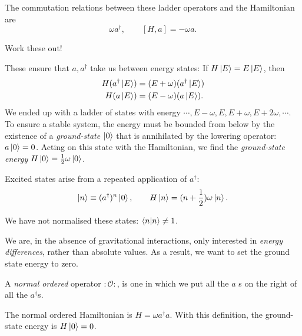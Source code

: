 The commutation relations between these ladder operators and the Hamiltonian are
\begin{equation}
  [H, a^\dagger] \omega a^\dagger, \qquad [H, a] = -\omega a.
\end{equation} 
\begin{exercise}
Work these out!
\end{exercise}
These ensure that $a, a^\dagger$ take us between energy states:
If $H \ket{E} = E \ket{E}$, then
\begin{align}
  H(a^\dagger \ket{E}) &= (E + \omega) (a^\dagger \ket{E}) \\
  H(a \ket{ E}) &=(E - \omega) (a \ket{E}).
\end{align}
We ended up with a ladder of states with energy $\cdots, E-\omega, E, E + \omega, E + 2 \omega, \cdots$.
To ensure a stable system, the energy must be bounded from below by the existence of a \emph{ground-state} $\ket{0}$ that is annihilated by the lowering operator: $a \ket{0} = 0$.
Acting on this state with the Hamiltonian, we find the \emph{ground-state energy} $H \ket{0} = \frac{1}{2} \omega \ket{0}$.

Excited states arise from a repeated application of $a^\dagger$:
 \begin{equation}
   \ket{n} \equiv (a^\dagger)^n \ket{0}, \qquad H \ket{n} = (n + \frac{1}{2}) \omega \ket{n}.
\end{equation}
\begin{leftbar}
  \begin{remark}
    We have not normalised these states: $\bra{n} \ket{n} \neq 1$.
  \end{remark}
\end{leftbar}
\begin{leftbar}
  \begin{remark}
    We are, in the absence of gravitational interactions, only interested in \emph{energy differences}, rather than absolute values. As a result, we want to set the ground state energy to zero.
  \end{remark}
\end{leftbar}

\begin{definition}
  A \emph{normal ordered} operator $:\mathcal{O}:$, is one in which we put all the $a$ s on the right of all the $a^\dagger$s.
\end{definition}

The normal ordered Hamiltonian is $H = \omega a^\dagger a$. With this definition, the ground-state energy is $H \ket{0} = 0$.
